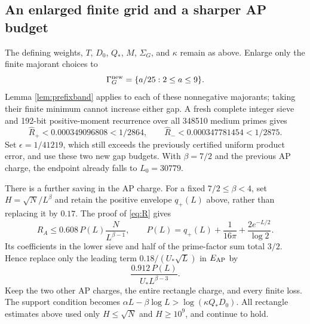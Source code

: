 \documentclass[11pt]{article}
\begin{document}
\subsection{An enlarged finite grid and a sharper AP budget}\label{sec:densegrh}
The defining weights, $T$, $D_0$, $Q_*$, $M$, $\Sigma_G$, and
$\kappa$ remain as above. Enlarge only the finite majorant choices to
\[
\Gamma_G^{\rm new}=\{a/25:2\le a\le9\}.
\]
Lemma \ref{lem:prefixband} applies to each of these nonnegative
majorants; taking their finite minimum cannot increase either gap.
A fresh complete integer sieve and 192-bit positive-moment recurrence
over all 348510 medium primes gives
\[
\widehat R_+<0.000349096808<1/2864,\qquad
\widehat R_-<0.000347781454<1/2875.
\]
Set $\epsilon=1/41219$, which still exceeds the previously certified
uniform product error, and use these two new gap budgets.
With $\beta=7/2$ and the previous AP charge, the endpoint already
falls to $L_0=30779$.

There is a further saving in the AP charge. For a fixed
$7/2\le\beta<4$, set $H=\sqrt N/L^\beta$ and retain the positive
envelope $q_+(L)$ above, rather than replacing it by $0.17$.
The proof of \eqref{eq:R} gives
\[
R_A\le0.608\,P(L)\frac{N}{L^{\beta-1}},\qquad
P(L)=q_+(L)+\frac1{16\pi}+\frac{2e^{-L/2}}{\log2}.
\]
Its coefficients in the lower sieve and half of the prime-factor
sum total $3/2$. Hence replace only the leading term
$0.18/(U_*\sqrt L)$ in $E_{\rm AP}$ by
\begin{equation}\label{eq:denseap}
\frac{0.912\,P(L)}{U_*L^{\beta-3}}.
\end{equation}
Keep the two other AP charges, the entire rectangle charge, and
every finite loss. The support condition becomes
$\alpha L-\beta\log L>\log(\kappa Q_*D_0)$.
All rectangle estimates above used only $H\le\sqrt N$ and
$H\ge10^9$, and continue to hold.
\end{document}
